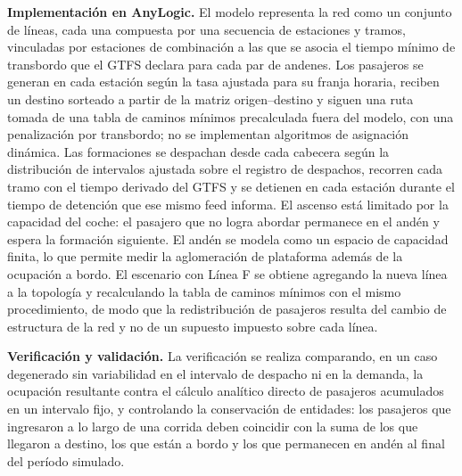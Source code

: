 \documentclass{article}
\begin{document}
\textbf{Implementación en AnyLogic.} El modelo representa la red como un conjunto de líneas, cada una
compuesta por una secuencia de estaciones y tramos, vinculadas por estaciones de combinación a las que se
asocia el tiempo mínimo de transbordo que el GTFS declara para cada par de andenes. Los pasajeros se generan
en cada estación según la tasa ajustada para su franja horaria, reciben un destino sorteado a partir de la
matriz origen--destino y siguen una ruta tomada de una tabla de caminos mínimos precalculada fuera del
modelo, con una penalización por transbordo; no se implementan algoritmos de asignación dinámica. Las
formaciones se despachan desde cada cabecera según la distribución de intervalos ajustada sobre el registro
de despachos, recorren cada tramo con el tiempo derivado del GTFS y se detienen en cada estación durante el
tiempo de detención que ese mismo feed informa. El ascenso está limitado por la capacidad del coche: el
pasajero que no logra abordar permanece en el andén y espera la formación siguiente. El andén se modela como un espacio de
capacidad finita, lo que permite medir la aglomeración de plataforma además de la ocupación a bordo. El
escenario con Línea F se obtiene agregando la nueva línea a la topología y recalculando la tabla de
caminos mínimos con el mismo procedimiento, de modo que la redistribución de pasajeros resulta del cambio
de estructura de la red y no de un supuesto impuesto sobre cada línea.

\textbf{Verificación y validación.} La verificación se realiza comparando, en un caso degenerado sin
variabilidad en el intervalo de despacho ni en la demanda, la ocupación resultante contra el cálculo
analítico directo de pasajeros acumulados en un intervalo fijo, y controlando la conservación de entidades:
los pasajeros que ingresaron a lo largo de una corrida deben coincidir con la suma de los que llegaron a
destino, los que están a bordo y los que permanecen en andén al final del período simulado.
\end{document}
